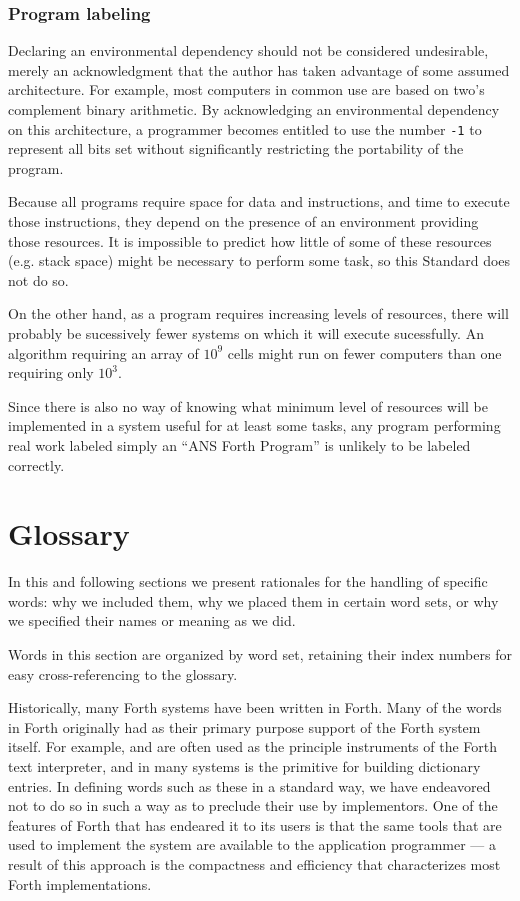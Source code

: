 \setcounter{subsubsection}{1}
\subsubsection{Program labeling} %

Declaring an environmental dependency should not be considered
undesirable, merely an acknowledgment that the author has taken
advantage of some assumed architecture. For example, most computers
in common use are based on two's complement binary arithmetic. By
acknowledging an environmental dependency on this architecture,
a programmer becomes entitled to use the number \texttt{-1} to
represent all bits set without significantly restricting the
portability of the program.

Because all programs require space for data and instructions, and
time to execute those instructions, they depend on the presence of
an environment providing those resources. It is impossible to predict
how little of some of these resources (e.g. stack space) might be
necessary to perform some task, so this Standard does not do so.

On the other hand, as a program requires increasing levels of
resources, there will probably be sucessively fewer systems on
which it will execute sucessfully. An algorithm requiring an array
of $10^9$ cells might run on fewer computers than one requiring
only $10^3$.

Since there is also no way of knowing what minimum level of resources
will be implemented in a system useful for at least some tasks, any
program performing real work labeled simply an ``ANS Forth Program''
is unlikely to be labeled correctly.


\section{Glossary} %

In this and following sections we present rationales for the handling
of specific words: why we included them, why we placed them in certain
word sets, or why we specified their names or meaning as we did.

Words in this section are organized by word set, retaining their index
numbers for easy cross-referencing to the glossary.

Historically, many Forth systems have been written in Forth. Many of
the words in Forth originally had as their primary purpose support of
the Forth system itself. For example,  and  are
often used as the principle instruments of the Forth text interpreter,
and  in many systems is the primitive for building
dictionary entries. In defining words such as these in a standard way,
we have endeavored not to do so in such a way as to preclude their use
by implementors. One of the features of Forth that has endeared it to
its users is that the same tools that are used to implement the system
are available to the application programmer --- a result of this
approach is the compactness and efficiency that characterizes most
Forth implementations.

